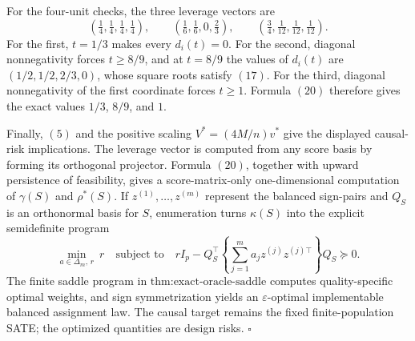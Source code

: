 For the four-unit checks, the three leverage vectors are
\[
\left(\tfrac14,\tfrac14,\tfrac14,\tfrac14\right),
\qquad
\left(\tfrac16,\tfrac16,0,\tfrac23\right),
\qquad
\left(\tfrac34,\tfrac1{12},\tfrac1{12},\tfrac1{12}\right).
\tag{23}
\]
For the first, \(t=1/3\) makes every \(d_i(t)=0\). For the second, diagonal nonnegativity forces \(t\geq8/9\), and at \(t=8/9\) the values of \(d_i(t)\) are \((1/2,1/2,2/3,0)\), whose square roots satisfy \((17)\). For the third, diagonal nonnegativity of the first coordinate forces \(t\geq1\). Formula \((20)\) therefore gives the exact values \(1/3\), \(8/9\), and \(1\).

Finally, \((5)\) and the positive scaling \(V^*=(4M/n)v^*\) give the displayed causal-risk implications. The leverage vector is computed from any score basis by forming its orthogonal projector. Formula \((20)\), together with upward persistence of feasibility, gives a score-matrix-only one-dimensional computation of \(\gamma(S)\) and \(\rho^*(S)\). If \(z^{(1)},\ldots,z^{(m)}\) represent the balanced sign-pairs and \(Q_S\) is an orthonormal basis for \(S\), enumeration turns \(\kappa(S)\) into the explicit semidefinite program
\[
\min_{a\in\Delta_m,\,r}\ r
\quad\text{subject to}\quad
rI_p-Q_S^\top\left\{\sum_{j=1}^m a_jz^{(j)}z^{(j)\top}\right\}Q_S\succeq0.
\tag{24}
\]
The finite saddle program in \(\text{thm:exact-oracle-saddle}\) computes quality-specific optimal weights, and sign symmetrization yields an \(\varepsilon\)-optimal implementable balanced assignment law. The causal target remains the fixed finite-population SATE; the optimized quantities are design risks. \(\square\)